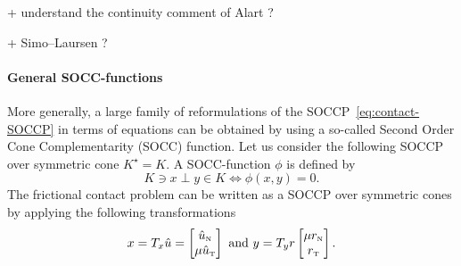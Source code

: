 \begin{ndrva}
  + understand the continuity comment of Alart ?

  + Simo--Laursen ?

\end{ndrva}



\paragraph{General SOCC-functions}

More generally, a large family of reformulations of the SOCCP~\eqref{eq:contact-SOCCP} in terms of equations can be obtained by using a so-called Second Order Cone Complementarity (SOCC) function. Let us consider the following SOCCP over symmetric cone $K^\star = K $. A SOCC-function $\phi$ is defined by
\begin{equation}
  \label{eq:SOCC-function}
  K \ni x \perp y \in K \Longleftrightarrow \phi(x,y)=0.
\end{equation}
The frictional contact problem can be written as a SOCCP over symmetric cones by applying the following transformations
\begin{equation}
  \label{eq:SOCC-function1}
  x = T_x \hat u =
  \begin{bmatrix}
    \hat u_\n \\
    \mu \hat u_{\t}
  \end{bmatrix}
  \text{ and }  y =T_y r
  \begin{bmatrix}
    \mu r_\n \\
    r_\t
  \end{bmatrix}.
\end{equation}

